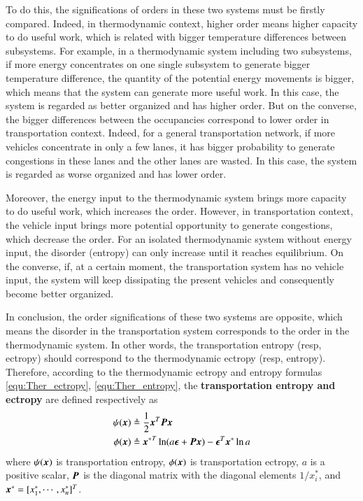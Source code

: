 \documentclass[preprint,authoryear,12pt]{elsarticle}
\renewcommand{\vec}[1]{\mbox{\boldmath$#1$}}
\newcommand{\mat}[1]{\mbox{\boldmath$#1$}}
\begin{document}
To do this, the significations of orders in these two systems must be firstly compared. Indeed, in thermodynamic context, higher order means higher capacity to do useful work, which is related with bigger temperature differences between subsystems. For example, in a thermodynamic system including two subsystems, if more energy concentrates on one single subsystem to generate bigger temperature difference, the quantity of the potential energy movements is bigger, which means that the system can generate more useful work. In this case, the system is regarded as better organized and has higher order. But on the converse, the bigger differences between the occupancies correspond to lower order in transportation context. Indeed, for a general transportation network, if more vehicles concentrate in only a few lanes, it has bigger probability to generate congestions in these lanes and the other lanes are wasted. In this case, the system is regarded as worse organized and has lower order.

Moreover, the energy input to the thermodynamic system brings more capacity to do useful work, which increases the order. However, in transportation context, the vehicle input brings more potential opportunity to generate congestions, which decrease the order. For an isolated thermodynamic system without energy input, the disorder (entropy) can only increase until it reaches equilibrium. On the converse, if, at a certain moment, the transportation system has no vehicle input, the system will keep dissipating the present vehicles and consequently become better organized.

In conclusion, the order significations of these two systems are opposite, which means the disorder in the transportation system corresponds to the order in the thermodynamic system. In other words, the transportation entropy (resp, ectropy) should correspond to the thermodynamic ectropy (resp, entropy). Therefore, according to the thermodynamic ectropy and entropy formulas \eqref{equ:Ther_ectropy}, \eqref{equ:Ther_entropy}, the \textbf{transportation entropy and ectropy} are defined respectively as
\begin{align}
\label{equ:Tran_entropy}
\psi(\vec{x}) &\triangleq \frac{1}{2}\vec{x}^T \mat{P} \vec{x}\\
\phi(\vec{x}) &\triangleq{\vec{x}^*}^T \ln
(a\vec{\epsilon}+\mat{P}\vec{x}) -\vec{\epsilon}^T\vec{x}^*\ln a
\label{equ:Tran_ectropy}
\end{align}
where $\psi(\vec{x})$ is transportation entropy, $\phi(\vec{x})$ is transportation ectropy, $a$ is a positive scalar, $\mat{P}$ is the diagonal matrix with the diagonal elements $1/x_i^*$, and $\vec{x}^*=[x_1^*,\cdots,x_n^*]^T$.
\end{document}
